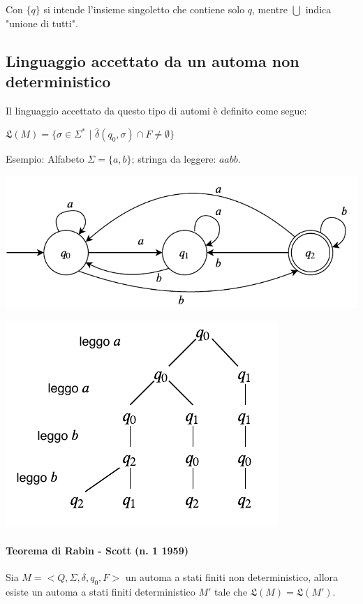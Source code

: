 \documentclass[a4paper, 10pt]{report}
\begin{document}
\noindent Con $\{q\}$ si intende l'insieme singoletto che contiene solo $q$, mentre $\bigcup$ indica "unione di tutti".

\subsection*{Linguaggio accettato da un automa non deterministico}
Il linguaggio accettato da questo tipo di automi è definito come segue:
\begin{center}
$\mathfrak{L}(M) = \{ \sigma \in \Sigma^* $ | $ \hat{\delta}(q_0, \sigma) \cap F \ne \emptyset \}$  
\end{center}

\noindent Esempio:
Alfabeto $\Sigma = \{ a, b\}$; stringa da leggere: $aabb$.

\begin{center}
\includegraphics[scale=1]{16ottobre02.pdf}

\includegraphics[scale=1]{16ottobre03.pdf}
\end{center}

\paragraph*{Teorema di Rabin - Scott (n. 1 1959)}
Sia $M = <Q, \Sigma, \delta, q_0, F>$ un automa a stati finiti non deterministico, allora esiste un automa a stati finiti deterministico $M'$ tale che $\mathfrak{L}(M) = \mathfrak{L}(M')$.
\end{document}
